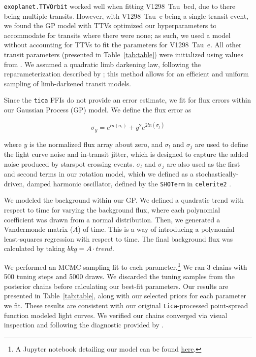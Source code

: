 \documentclass[linenumbers,twocolumn]{aastex631}
\newcommand{\planete}{V1298~Tau~e\xspace}
\newcommand{\planetknown}{V1298~Tau~bcd\xspace}
\begin{document}
\texttt{exoplanet.TTVOrbit} worked well when fitting \planetknown, due to there being multiple transits. However, with \planete being a single-transit event, we found the GP model with TTVs optimized our hyperparameters to accommodate for transits where there were none; as such, we used a model without accounting for TTVs to fit the parameters for \planete. All other transit parameters (presented in Table~\ref{tab:table}) were initialized using values from \cite{David2019a}. We assumed a quadratic limb darkening law, following the reparameterization described by \cite{kipping13}; this method allows for an efficient and uniform sampling of limb-darkened transit models.


Since the \texttt{tica} FFIs do not provide an error estimate, we fit for flux errors within our Gaussian Process (GP) model. We define the flux error as

\begin{equation}
    \sigma_y = e^{ln(\sigma_l)} + y^2 e^{2 ln(\sigma_j)}
\end{equation}

where $y$ is the normalized flux array about zero, and $\sigma_l$  and $\sigma_j$ are used to define the light curve noise and in-transit jitter, which is designed to capture the added noise produced by starspot crossing events. $\sigma_l$  and $\sigma_j$ are also used as the first and second terms in our rotation model, which we defined as a stochastically-driven, damped harmonic oscillator, defined by the \texttt{SHOTerm} in \texttt{celerite2} \citep{dfm17}.

We modeled the background within our GP. We defined a quadratic trend with respect to time for varying the background flux, where each polynomial coefficient was drawn from a normal distribution. Then, we generated a Vandermonde matrix ($A$) of time. This is a way of introducing a polynomial least-squares regression with respect to time. The final background flux was calculated by taking $bkg = A \cdot trend$.  

We performed an MCMC sampling fit to each parameter.\footnote{A Jupyter notebook detailing our model can be found \href{https://github.com/afeinstein20/v1298tau\_tess/blob/main/notebooks/TESS\_V1298Tau.ipynb}{here}.} We ran 3 chains with 500 tuning steps and 5000 draws. We discarded the tuning samples from the posterior chains before calculating our best-fit parameters. Our results are presented in Table~\ref{tab:table}, along with our selected priors for each parameter we fit. These results are consistent with our original \texttt{tica}-processed point-spread function modeled light curves. We verified our chains converged via visual inspection and following the diagnostic provided by \cite{Geweke92}.
\end{document}

